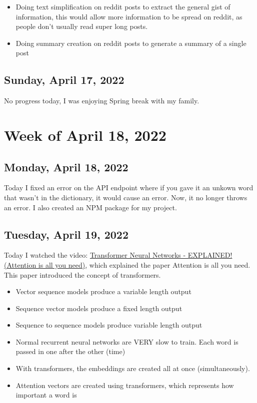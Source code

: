 \documentclass[11pt,letterpaper]{article}
\begin{document}
\begin{itemize}
    \item Doing text simplification on reddit posts to extract the general gist of information, this would allow more information to be spread on reddit, as people don't usually read super long posts.
    \item Doing summary creation on reddit posts to generate a summary of a single post
\end{itemize}

\subsection{Sunday, April 17, 2022}
No progress today, I was enjoying Spring break with my family.

\section{Week of April 18, 2022}
\subsection{Monday, April 18, 2022}
Today I fixed an error on the API endpoint where if you gave it an unkown word that wasn't in the dictionary, it would cause an error. Now, it no longer throws an error. I also created an NPM package for my project.

\subsection{Tuesday, April 19, 2022}
Today I watched the video: \href{https://www.youtube.com/watch?v=TQQlZhbC5ps}{Transformer Neural Networks - EXPLAINED! (Attention is all you need)}, which explained the paper Attention is all you need. This paper introduced the concept of transformers.

\begin{itemize}
    \item Vector sequence models produce a variable length output
    \item Sequence vector models produce a fixed length output
    \item Sequence to sequence models produce variable length output
    \item Normal recurrent neural networks are VERY slow to train. Each word is passed in one after the other (time)
    \item With transformers, the embeddings are created all at once (simultaneously).
    \item Attention vectors are created using transformers, which represents how important a word is
\end{itemize}
\end{document}
